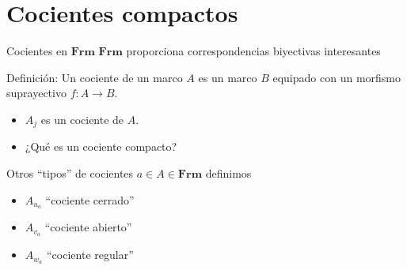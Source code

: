 \documentclass[compress,12pt]{beamer}
\begin{document}
\section{Cocientes compactos}
\begin{frame}{Cocientes en $\mathbf{Frm}$}
$\mathbf{Frm}$ proporciona correspondencias biyectivas interesantes

\end{frame}

\begin{frame}
\begin{block}{Definición:}
    Un cociente de un marco $A$ es un marco $B$ equipado con un morfismo suprayectivo $f\colon A\to B$.
\end{block}
\begin{itemize}
\item<3-> $A_j$ es un cociente de $A$.
\item<4-> ¿Qué es un cociente compacto?
\end{itemize}
\end{frame}

\begin{frame}{Otros ``tipos'' de cocientes}
    $a\in A\in \mathbf{Frm}$ definimos
    
    \begin{itemize}
    \item<3-> $A_{u_a}$ ``cociente cerrado'' 
    \item<4-> $A_{v_a}$ ``cociente abierto'' 
    \item<5-> $A_{w_a}$ ``cociente regular'' 
    \end{itemize}
    
    \end{frame}
\end{document}
